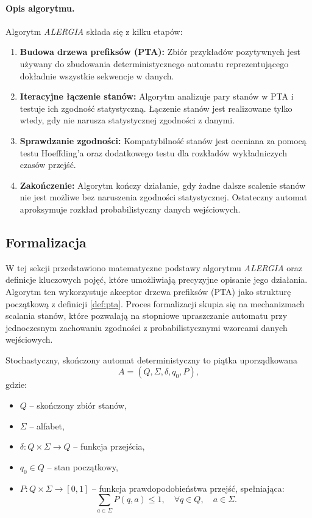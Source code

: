 \paragraph*{Opis algorytmu.}  
Algorytm \textit{ALERGIA} składa się z kilku etapów:  
\begin{enumerate}  
    \item \textbf{Budowa drzewa prefiksów (PTA):}  
        Zbiór przykładów pozytywnych jest używany do zbudowania deterministycznego automatu reprezentującego dokładnie wszystkie sekwencje w danych.  
    \item \textbf{Iteracyjne łączenie stanów:}  
        Algorytm analizuje pary stanów w PTA i testuje ich zgodność statystyczną. Łączenie stanów jest realizowane tylko wtedy, gdy nie narusza statystycznej zgodności z danymi.  
    \item \textbf{Sprawdzanie zgodności:}  
        Kompatybilność stanów jest oceniana za pomocą testu Hoeffding'a oraz dodatkowego testu dla rozkładów wykładniczych czasów przejść.  
    \item \textbf{Zakończenie:}  
        Algorytm kończy działanie, gdy żadne dalsze scalenie stanów nie jest możliwe bez naruszenia zgodności statystycznej. Ostateczny automat aproksymuje rozkład probabilistyczny danych wejściowych.  
\end{enumerate}


\subsection{Formalizacja}  
W tej sekcji przedstawiono matematyczne podstawy algorytmu \textit{ALERGIA} oraz definicje kluczowych pojęć, które umożliwiają precyzyjne opisanie jego działania. Algorytm ten wykorzystuje akceptor drzewa prefiksów (PTA) jako strukturę początkową z definicji \ref{def:pta}. Proces formalizacji skupia się na mechanizmach scalania stanów, które pozwalają na stopniowe upraszczanie automatu przy jednoczesnym zachowaniu zgodności z probabilistycznymi wzorcami danych wejściowych.  

\begin{definition}[DSFA]  
\label{def:dsfa}
Stochastyczny, skończony automat deterministyczny to piątka uporządkowana
\[ 
A = (Q, \Sigma, \delta, q_0, P), 
\]
gdzie:  
\begin{itemize}  
    \item \( Q \) – skończony zbiór stanów,  
    \item \( \Sigma \) – alfabet,  
    \item \( \delta : Q \times \Sigma \to Q \) – funkcja przejścia,  
    \item \( q_0 \in Q \) – stan początkowy,  
    \item \( P: Q \times \Sigma \to [0, 1] \) – funkcja prawdopodobieństwa przejść, spełniająca:  
    \[
    \sum_{a \in \Sigma} P(q, a) \leq 1, \quad \forall q \in Q, \quad a \in \Sigma.
    \]  
\end{itemize}
\end{definition}

